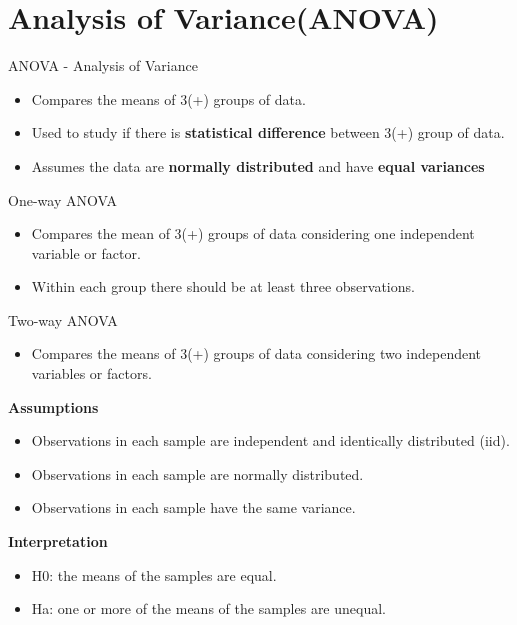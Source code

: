 


\maketitle
\section{Analysis of Variance(ANOVA)}
\begin{frame}[t]{ANOVA - Analysis of Variance}
    \begin{itemize}
      \item Compares the means of 3(+) groups of data.
      \item Used to study if there is \textbf{statistical difference} between 3(+) group of data.
      \item Assumes the data are \textbf{normally distributed} and have \textbf{equal variances}
    \end{itemize}

\end{frame}
\begin{frame}[t]{One-way ANOVA}
	\begin{itemize}
		\item Compares the mean of 3(+) groups of data considering one independent variable or factor.
		\item Within each group there should be at least three observations.
	\end{itemize}
\end{frame}
\begin{frame}[t]{Two-way ANOVA}
	\begin{itemize}
		\item Compares the means of 3(+) groups of data considering two independent variables or factors.
	\end{itemize}
	\textbf{Assumptions}\\
	\begin{itemize}
		\item Observations in each sample are independent and identically distributed (iid).
		\item Observations in each sample are normally distributed.
		\item Observations in each sample have the same variance.
	\end{itemize}
	\textbf{Interpretation}\\
	\begin{itemize}
		\item H0: the means of the samples are equal.
		\item Ha: one or more of the means of the samples are unequal.
	\end{itemize}
\end{frame}













